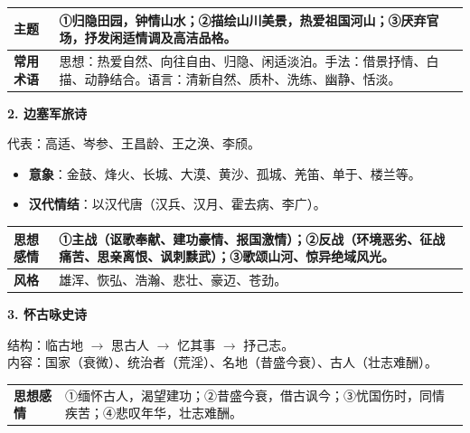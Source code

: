 \documentclass[11pt,a4paper]{article}
\begin{document}
\begin{tcolorbox}[colback=white, colframe=black!50, title=山水田园诗特征, boxrule=0.5pt, sharp corners=downhill]
\begin{tabularx}{\textwidth}{@{}lX@{}}
\textbf{主题} & ①归隐田园，钟情山水；②描绘山川美景，热爱祖国河山；③厌弃官场，抒发闲适情调及高洁品格。 \\ \midrule
\textbf{常用术语} & 思想：热爱自然、向往自由、归隐、闲适淡泊。手法：借景抒情、白描、动静结合。语言：清新自然、质朴、洗练、幽静、恬淡。 \\
\end{tabularx}
\end{tcolorbox}

\textbf{2. 边塞军旅诗}

代表：高适、岑参、王昌龄、王之涣、李颀。
\begin{itemize}
    \item \textbf{意象}：金鼓、烽火、长城、大漠、黄沙、孤城、羌笛、单于、楼兰等。
    \item \textbf{汉代情结}：以汉代唐（汉兵、汉月、霍去病、李广）。
\end{itemize}

\begin{tcolorbox}[colback=white, colframe=black!50, title=边塞军旅诗特征, boxrule=0.5pt, sharp corners=downhill]
\begin{tabularx}{\textwidth}{@{}lX@{}}
\textbf{思想感情} & ①主战（讴歌奉献、建功豪情、报国激情）；②反战（环境恶劣、征战痛苦、思亲离恨、讽刺黩武）；③歌颂山河、惊异绝域风光。 \\ \midrule
\textbf{风格} & 雄浑、恢弘、浩瀚、悲壮、豪迈、苍劲。 \\
\end{tabularx}
\end{tcolorbox}

\textbf{3. 怀古咏史诗}

结构：临古地 $\to$ 思古人 $\to$ 忆其事 $\to$ 抒己志。\\
内容：国家（衰微）、统治者（荒淫）、名地（昔盛今衰）、古人（壮志难酬）。

\begin{tcolorbox}[colback=white, colframe=black!50, title=怀古咏史诗特征, boxrule=0.5pt, sharp corners=downhill]
\begin{tabularx}{\textwidth}{@{}lX@{}}
\textbf{思想感情} & ①缅怀古人，渴望建功；②昔盛今衰，借古讽今；③忧国伤时，同情疾苦；④悲叹年华，壮志难酬。 \\
\end{tabularx}
\end{tcolorbox}
\end{document}
